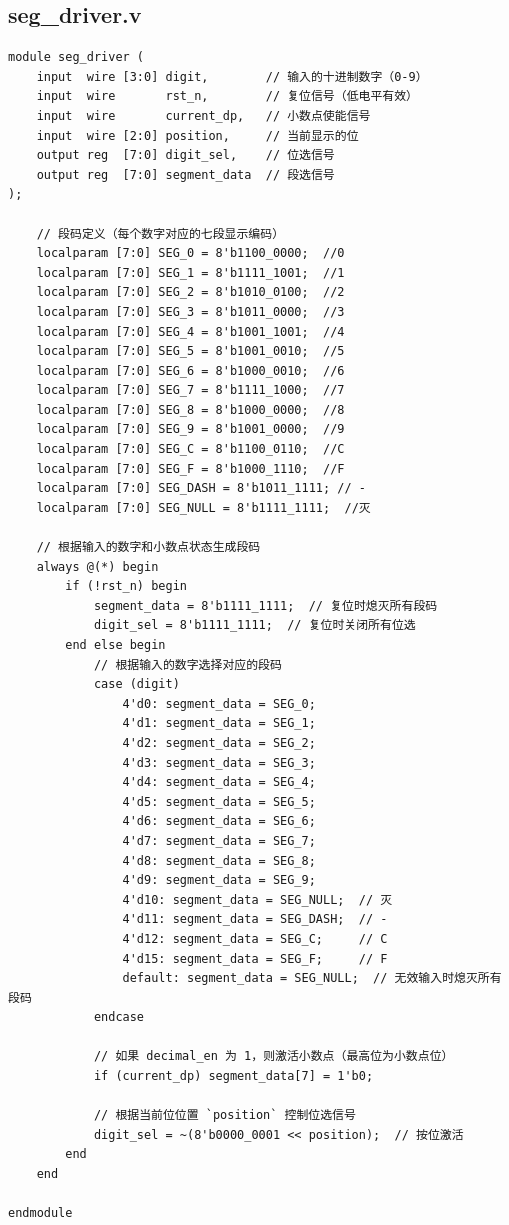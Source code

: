 \documentclass[a4paper,10pt]{article}
\begin{document}
\subsection{seg_driver.v}
\begin{lstlisting}[caption=seg_driver.v]
module seg_driver (
    input  wire [3:0] digit,        // 输入的十进制数字（0-9）
    input  wire       rst_n,        // 复位信号（低电平有效）
    input  wire       current_dp,   // 小数点使能信号
    input  wire [2:0] position,     // 当前显示的位
    output reg  [7:0] digit_sel,    // 位选信号
    output reg  [7:0] segment_data  // 段选信号
);

    // 段码定义（每个数字对应的七段显示编码）
    localparam [7:0] SEG_0 = 8'b1100_0000;  //0
    localparam [7:0] SEG_1 = 8'b1111_1001;  //1
    localparam [7:0] SEG_2 = 8'b1010_0100;  //2
    localparam [7:0] SEG_3 = 8'b1011_0000;  //3
    localparam [7:0] SEG_4 = 8'b1001_1001;  //4
    localparam [7:0] SEG_5 = 8'b1001_0010;  //5
    localparam [7:0] SEG_6 = 8'b1000_0010;  //6
    localparam [7:0] SEG_7 = 8'b1111_1000;  //7
    localparam [7:0] SEG_8 = 8'b1000_0000;  //8
    localparam [7:0] SEG_9 = 8'b1001_0000;  //9
    localparam [7:0] SEG_C = 8'b1100_0110;  //C
    localparam [7:0] SEG_F = 8'b1000_1110;  //F
    localparam [7:0] SEG_DASH = 8'b1011_1111; // -
    localparam [7:0] SEG_NULL = 8'b1111_1111;  //灭

    // 根据输入的数字和小数点状态生成段码
    always @(*) begin
        if (!rst_n) begin
            segment_data = 8'b1111_1111;  // 复位时熄灭所有段码
            digit_sel = 8'b1111_1111;  // 复位时关闭所有位选
        end else begin
            // 根据输入的数字选择对应的段码
            case (digit)
                4'd0: segment_data = SEG_0;
                4'd1: segment_data = SEG_1;
                4'd2: segment_data = SEG_2;
                4'd3: segment_data = SEG_3;
                4'd4: segment_data = SEG_4;
                4'd5: segment_data = SEG_5;
                4'd6: segment_data = SEG_6;
                4'd7: segment_data = SEG_7;
                4'd8: segment_data = SEG_8;
                4'd9: segment_data = SEG_9;
                4'd10: segment_data = SEG_NULL;  // 灭
                4'd11: segment_data = SEG_DASH;  // -
                4'd12: segment_data = SEG_C;     // C
                4'd15: segment_data = SEG_F;     // F
                default: segment_data = SEG_NULL;  // 无效输入时熄灭所有段码
            endcase

            // 如果 decimal_en 为 1，则激活小数点（最高位为小数点位）
            if (current_dp) segment_data[7] = 1'b0;

            // 根据当前位位置 `position` 控制位选信号
            digit_sel = ~(8'b0000_0001 << position);  // 按位激活
        end
    end

endmodule

\end{lstlisting}
\end{document}
